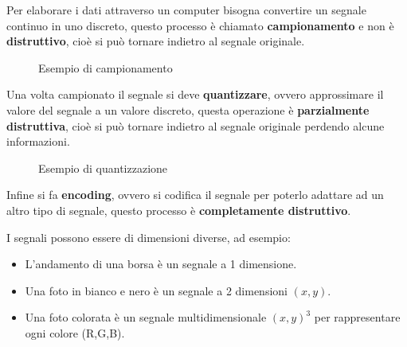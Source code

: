 \documentclass[a4paper]{article}
\begin{document}
\noindent
Per elaborare i dati attraverso un computer bisogna convertire un segnale continuo
in uno discreto, questo processo è chiamato \textbf{campionamento} e non è
\textbf{distruttivo}, cioè si può tornare indietro al segnale originale.
\begin{figure}[H]
  \centering
  \caption{Esempio di campionamento}
\end{figure}

\noindent
Una volta campionato il segnale si deve \textbf{quantizzare}, ovvero approssimare
il valore del segnale a un valore discreto, questa operazione è \textbf{parzialmente
distruttiva}, cioè si può tornare indietro al segnale originale perdendo alcune
informazioni.
\begin{figure}[H]
  \centering
  \caption{Esempio di quantizzazione}
\end{figure}

Infine si fa \textbf{encoding}, ovvero
si codifica il segnale per poterlo adattare ad un altro tipo di segnale, questo
processo è \textbf{completamente distruttivo}.

\vspace{1em}
\noindent
I segnali possono essere di dimensioni diverse, ad esempio:
\begin{itemize}
  \item L'andamento di una borsa è un segnale a 1 dimensione.
  \item Una foto in bianco e nero è un segnale a 2 dimensioni \( (x,y) \).
  \item Una foto colorata è un segnale multidimensionale \( (x,y)^3 \) per
    rappresentare ogni colore (R,G,B).
\end{itemize}
\end{document}
